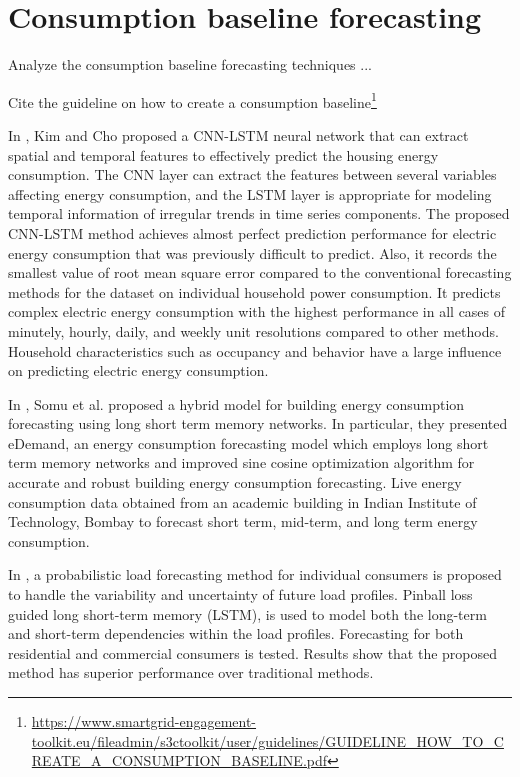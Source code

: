 \section{Consumption baseline forecasting}
\label{sec:baselinesoa}
\vspace{0.2 cm}

Analyze the consumption baseline forecasting techniques ...

Cite the guideline on how to create a consumption baseline\footnote{ \url{https://www.smartgrid-engagement-toolkit.eu/fileadmin/s3ctoolkit/user/guidelines/GUIDELINE_HOW_TO_CREATE_A_CONSUMPTION_BASELINE.pdf} }

In \cite{KIM201972}, Kim and Cho proposed a CNN-LSTM neural network that can extract spatial and temporal features to effectively predict the housing energy consumption.
The CNN layer can extract the features between several variables affecting energy consumption, and the LSTM layer is appropriate for modeling temporal information of irregular trends in time series components. The proposed CNN-LSTM method achieves almost perfect prediction performance for electric energy consumption that was previously difficult to predict.
Also, it records the smallest value of root mean square error compared to the conventional forecasting methods for the dataset on individual household power consumption.
It predicts complex electric energy consumption with the highest performance in all cases of minutely, hourly, daily, and weekly unit resolutions compared to other methods.
Household characteristics such as occupancy and behavior have a large influence on predicting electric energy consumption.

In \cite{SOMU2020114131}, Somu et al. proposed a hybrid model for building energy consumption forecasting using long short term memory networks.
In particular, they presented eDemand, an energy consumption forecasting model which employs long short term memory networks and improved sine cosine optimization algorithm for accurate and robust building energy consumption forecasting.
Live energy consumption data obtained from an academic building in Indian Institute of Technology, Bombay to forecast short term, mid-term, and long term energy consumption.

In \cite{WANG201910}, a probabilistic load forecasting method for individual consumers is proposed to handle the variability and uncertainty of future load profiles.
Pinball loss guided long short-term memory (LSTM), is used to model both the long-term and short-term dependencies within the load profiles.
Forecasting for both residential and commercial consumers is tested.
Results show that the proposed method has superior performance over traditional methods.

